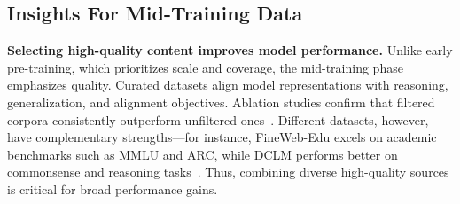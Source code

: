\subsection{Insights For Mid-Training Data}
\textbf{Selecting high-quality content improves model performance.}
Unlike early pre-training, which prioritizes scale and coverage, the mid-training phase emphasizes quality. Curated datasets align model representations with reasoning, generalization, and alignment objectives. Ablation studies confirm that filtered corpora consistently outperform unfiltered ones~\cite{Su2024NemotronCCTC, wang2025ultra, penedo2024fineweb}. Different datasets, however, have complementary strengths—for instance, FineWeb-Edu excels on academic benchmarks such as MMLU and ARC, while DCLM performs better on commonsense and reasoning tasks~\cite{penedo2024fineweb, NEURIPS2024_19e4ea30}. Thus, combining diverse high-quality sources is critical for broad performance gains.

